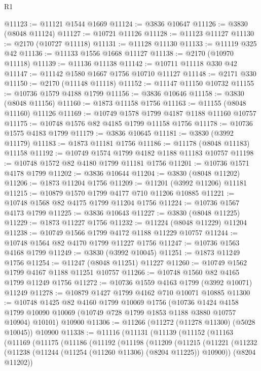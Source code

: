 \begin{lexlean}{R1}
\begin{coremodule}
@11123 := @11121 @1544 @1669
@11124 := @3836 @10647
@11126 := @3830 (@8048 @11124)
@11127 := @10721 @11126
@11128 := @11123 @11127
@11130 := @2170 (@10727 @11118)
@11131 := @11128 @11130
@11133 := @11119 @325 @42
@11136 := @11133 @1556 @1668 @11127
@11138 := @2170 (@10970 @11118)
@11139 := @11136 @11138
@11142 := @10711 @11118 @330 @42
@11147 := @11142 @1580 @1667 @1756 @10710 @11127
@11148 := @2171 @330
@11150 := @2170 (@11148 @11118)
@11152 := @11147 @11150 @10732
@11155 := @10736 @1579 @4188 @1799
@11156 := @3836 @10646
@11158 := @3830 (@8048 @11156)
@11160 := @1873 @11158 @1756
@11163 := @11155 (@8048 @11160) @11126
@11169 := @10749 @1578 @1799 @4187 @1188 @11160 @10757
@11175 := @10748 @1576 @82 @4185 @1799 @11158 @1756
@11178 := @10736 @1575 @4183 @1799
@11179 := @3836 @10645
@11181 := @3830 (@3992 @11179)
@11183 := @1873 @11181 @1756
@11186 := @11178 (@8048 @11183) @11158
@11192 := @10749 @1574 @1799 @4182 @1188 @11183 @10757
@11198 := @10748 @1572 @82 @4180 @1799 @11181 @1756
@11201 := @10736 @1571 @4178 @1799
@11202 := @3836 @10644
@11204 := @3830 (@8048 @11202)
@11206 := @1873 @11204 @1756
@11209 := @11201 (@3992 @11206) @11181
@11215 := @10879 @1570 @1799 @4177 @710 @11206 @10885
@11221 := @10748 @1568 @82 @4175 @1799 @11204 @1756
@11224 := @10736 @1567 @4173 @1799
@11225 := @3836 @10643
@11227 := @3830 (@8048 @11225)
@11229 := @1873 @11227 @1756
@11232 := @11224 (@8048 @11229) @11204
@11238 := @10749 @1566 @1799 @4172 @1188 @11229 @10757
@11244 := @10748 @1564 @82 @4170 @1799 @11227 @1756
@11247 := @10736 @1563 @4168 @1799
@11249 := @3830 (@3992 @10045)
@11251 := @1873 @11249 @1756
@11254 := @11247 (@8048 @11251) @11227
@11260 := @10749 @1562 @1799 @4167 @1188 @11251 @10757
@11266 := @10748 @1560 @82 @4165 @1799 @11249 @1756
@11272 := @10736 @1559 @4163 @1799 (@3992 @10071) @11249
@11278 := @10879 @1427 @1799 @4162 @710 @10071 @10885
@11300 := @10748
    @1425
    @82
    @4160
    @1799
    @10069
    @1756
    (@10736
      @1424
      @4158
      @1799
      @10090
      @10069
      (@10749 @728 @1799 @1853 @1188 @3880 @10757 @10904)
      @10101)
    @10900
@11306 := @11266 (@11272 (@11278 @11300) (@5028 @10045)) @10900
@11338 := @11116
    (@11131
      (@11139
        (@11152
          (@11163
            (@11169
              (@11175
                (@11186
                  (@11192
                    (@11198
                      (@11209
                        (@11215
                          (@11221
                            (@11232
                              (@11238 (@11244 (@11254 (@11260 @11306) (@8204 @11225)) @10900))
                              (@8204 @11202))

\end{coremodule}
\end{lexlean}
